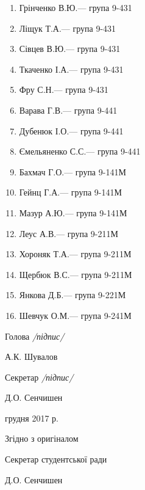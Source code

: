 \documentclass[
	a4paper,
	12pt,
	oneside,
	draft
]{extreport}
\newcommand{\sign}[2]{
	\bigskip\par\noindent
	\begin{minipage}[b]{70mm}#1\end{minipage}	\hfill
	\begin{minipage}[b]{50mm}#2\end{minipage}	\par	}
\newcommand{\signEqualProof}[3]{
	\bigskip\vfill
	\par\noindent #1
	\par\noindent Згідно з оригіналом
	\sign{#2}{#3}\vfill}
\newcommand{\writerTel}[2]{
	\vfill\scriptsize\parindent=-0.5mm
	\par\noindent #1
	\par\noindent #2}
\begin{document}
{\begin{multicols}{2}
\begin{enumerate}[topsep=0pt,itemsep=-1ex,partopsep=1ex,parsep=1ex]
\item Грінченко В.Ю.\hfill --- група 9-431
\item Ліщук Т.А.\hfill --- група 9-431
\item Сівцев В.Ю.\hfill --- група 9-431
\item Ткаченко І.А.\hfill --- група 9-431
\item Фру С.Н.\hfill --- група 9-431
\item Варава Г.В.\hfill --- група 9-441
\item Дубенюк І.О.\hfill --- група 9-441
\item Ємельяненко С.С.\hfill --- група 9-441
\item Бахмач Г.О.\hfill --- група 9-141М
\item Гейнц Г.А.\hfill --- група 9-141М
\item Мазур А.Ю.\hfill --- група 9-141М
\item Леус А.В.\hfill --- група 9-211М
\item Хороняк Т.А.\hfill --- група 9-211М
\item Щербюк В.С.\hfill --- група 9-211М
\item Янкова Д.Б.\hfill --- група 9-221М
\item Шевчук О.М.\hfill --- група 9-241М
\end{enumerate}
\end{multicols}
}

\bfseries 
\sign{Голова {\hfill\normalfont\small\itshape /підпис/} }{А.К. Шувалов}
\sign{Секретар {\hfill\normalfont\small\itshape /підпис/} }{Д.О. Сенчишен}
\normalfont

\signEqualProof{07 грудня 2017 р.}{Секретар студентської ради}{Д.О. Сенчишен}
\vfill
\vfill
\vfill
\vfill

\end{document}
